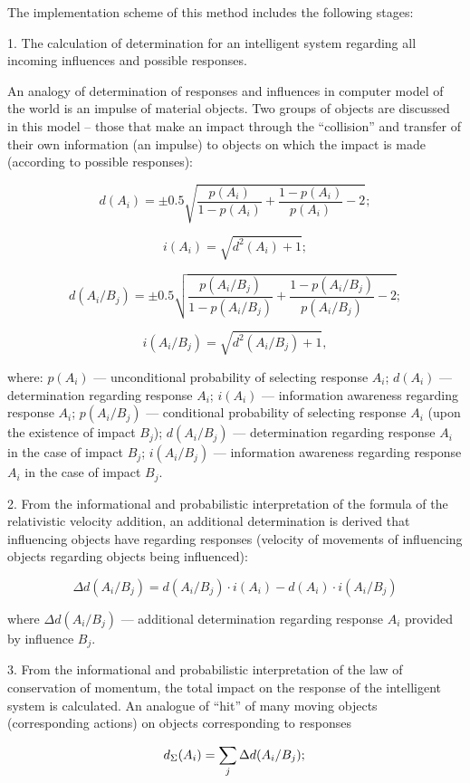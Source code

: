 \documentclass[review,authoryear]{elsarticle}
\begin{document}
The implementation scheme of this method includes the following stages:

1. The calculation of determination for an intelligent system regarding all incoming influences and possible responses.

An analogy of determination of responses and influences in computer model of the world is an impulse of material objects. Two groups of objects are discussed in this model – those that make an impact through the “collision” and transfer of their own information (an impulse) to objects on which the impact is made (according to possible responses): 

\[
d(A_i)=\pm0.5\sqrt{\frac{p(A_i)}{1-p(A_i)}+\frac{1-p(A_i)}{p(A_i)}-2};
\]

\[
i(A_i)=\sqrt{d^2(A_i)+1};
\]

\[
d(A_i/B_j)=\pm0.5\sqrt{\frac{p(A_i/B_j)}{1-p(A_i/B_j)}+\frac{1-p(A_i/B_j)}{p(A_i/B_j)}-2};
\]

\[
i(A_i/B_j)=\sqrt{d^2(A_i/B_j)+1},
\]

\noindent
where: $p(A_i)$ — unconditional probability of selecting response $A_i$; $d(A_i)$ — determination regarding response $A_i$; $i(A_i)$ — information awareness regarding response $A_i$; $p(A_i/B_j)$ — conditional probability of selecting response $A_i$ (upon the existence of impact $B_j$); $d(A_i/B_j)$ — determination regarding response $A_i$ in the case of impact $B_j$; $i(A_i/B_j)$ — information awareness regarding response $A_i$ in the case of impact $B_j$.

2. From the informational and probabilistic interpretation of the formula of the relativistic velocity addition, an additional determination is derived that influencing objects have regarding responses (velocity of movements of influencing objects regarding objects being influenced): 

\[
\Delta d(A_i/B_j)=d(A_i/B_j)\cdot i(A_i)-d(A_i)\cdot i(A_i/B_j)
\]

\noindent
where $\Delta d(A_i/B_j)$ — additional determination regarding response $A_i$ provided by influence $B_j$. 

3. From the informational and probabilistic interpretation of the law of conservation of momentum, the total impact on the response of the intelligent system is calculated. An analogue of “hit” of many moving objects (corresponding actions) on objects corresponding to responses

\[
d_\Sigma(A_i) = \sum_j \Delta d(A_i/B_j); \\
\]
\end{document}
